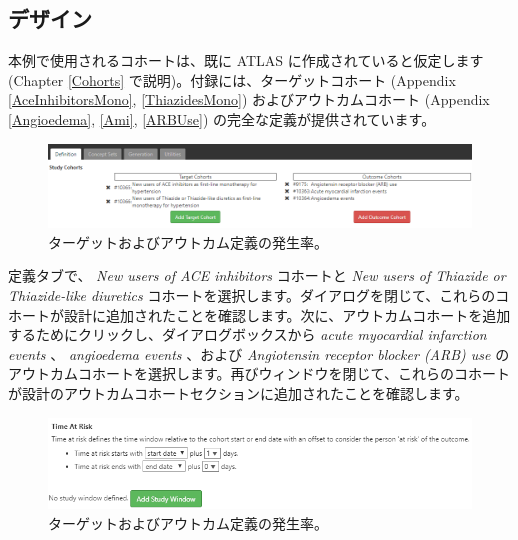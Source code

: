 \documentclass[
  11pt]{book}
\theoremstyle{definition}
\theoremstyle{definition}
\theoremstyle{definition}
\theoremstyle{definition}
\theoremstyle{remark}
\begin{document}
\subsection{デザイン}\label{ux30c7ux30b6ux30a4ux30f3-2}

本例で使用されるコホートは、既に ATLAS に作成されていると仮定します (Chapter \ref{Cohorts} で説明)。付録には、ターゲットコホート (Appendix \ref{AceInhibitorsMono}, \ref{ThiazidesMono}) およびアウトカムコホート (Appendix \ref{Angioedema}, \ref{Ami}, \ref{ARBUse}) の完全な定義が提供されています。

\begin{figure}

{\centering \includegraphics[width=1\linewidth]{images/Characterization/atlasIncidenceCohortSelection} 

}

\caption{ターゲットおよびアウトカム定義の発生率。}\label{fig:atlasIncidenceCohortSelection}
\end{figure}

定義タブで、 \emph{New users of ACE inhibitors} コホートと \emph{New users of Thiazide or Thiazide-like diuretics} コホートを選択します。ダイアログを閉じて、これらのコホートが設計に追加されたことを確認します。次に、アウトカムコホートを追加するためにクリックし、ダイアログボックスから \emph{acute myocardial infarction events} 、 \emph{angioedema events} 、および \emph{Angiotensin receptor blocker (ARB) use} のアウトカムコホートを選択します。再びウィンドウを閉じて、これらのコホートが設計のアウトカムコホートセクションに追加されたことを確認します。

\begin{figure}

{\centering \includegraphics[width=1\linewidth]{images/Characterization/atlasIncidenceTimeAtRisk} 

}

\caption{ターゲットおよびアウトカム定義の発生率。}\label{fig:atlasIncidenceTimeAtRisk}
\end{figure}
\end{document}
